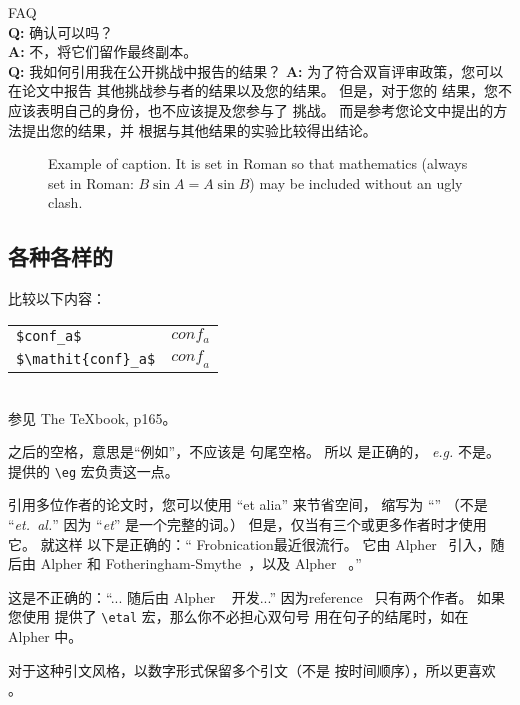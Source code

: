 \documentclass[10pt,letterpaper,a4paper]{article}
\begin{document}
\begin{sloppypar}
\noindent
FAQ\medskip\\
{\bf Q:} 确认可以吗？\\
{\bf A:} 不，将它们留作最终副本。\medskip\\
{\bf Q:} 我如何引用我在公开挑战中报告的结果？
{\bf A:} 为了符合双盲评审政策，您可以在论文中报告
其他挑战参与者的结果以及您的结果。 但是，对于您的
结果，您不应该表明自己的身份，也不应该提及您参与了
挑战。 而是参考您论文中提出的方法提出您的结果，并
根据与其他结果的实验比较得出结论。\medskip\\
\begin{figure}[t]
\begin{center}
\fbox{\rule{0pt}{2in} \rule{0.9\linewidth}{0pt}}
\end{center}
   \caption{Example of caption.  It is set in Roman so that mathematics
   (always set in Roman: $B \sin A = A \sin B$) may be included without an
   ugly clash.}
\label{fig:long}
\label{fig:onecol}
\end{figure}

\subsection{各种各样的}
\noindent
比较以下内容：\\
\begin{tabular}{ll}
 \verb'$conf_a$' &  $conf_a$ \\
 \verb'$\mathit{conf}_a$' & $\mathit{conf}_a$
\end{tabular}\\
参见 The \TeX book, p165。

\eg 之后的空格，意思是“例如”，不应该是
句尾空格。 所以 \eg 是正确的， {\em e.g.} 不是。 提供的
\verb'\eg' 宏负责这一点。

引用多位作者的论文时，您可以使用 ``et alia'' 来节省空间，
缩写为 ``\etal'' （不是 ``{\em et.\ al.}'' 因为 ``{\em et}'' 是一个完整的词。）
但是，仅当有三个或更多作者时才使用它。 就这样
以下是正确的：``
    Frobnication最近很流行。
    它由 Alpher~\cite{Alpher02} 引入，随后由
    Alpher 和 Fotheringham-Smythe~\cite{Alpher03}，以及 Alpher \etal~\cite{Alpher04}。''

这是不正确的：``... 随后由 Alpher \etal~\cite{Alpher03} 开发...''
因为reference~\cite{Alpher03} 只有两个作者。 如果您使用
提供了 \verb'\etal' 宏，那么你不必担心双句号
用在句子的结尾时，如在 Alpher \etal 中。

对于这种引文风格，以数字形式保留多个引文（不是
按时间顺序），所以更喜欢 \cite{Alpher03,Alpher02,Authors20}
。



\end{sloppypar}
\end{document}
